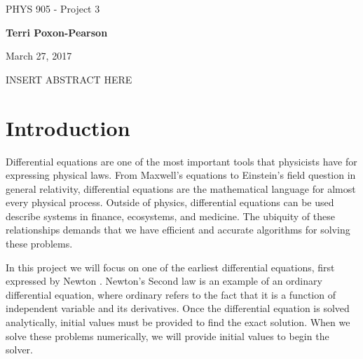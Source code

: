 \documentclass[%
oneside,                 %
final,                   %
10pt]{article}
\begin{document}

\newcommand{\exercisesection}[1]{\subsection*{#1}}






\thispagestyle{empty}

\begin{center}
{\LARGE\bf
\begin{spacing}{1.25}
PHYS 905 - Project 3
\end{spacing}
}
\end{center}


\begin{center}
{\bf Terri Poxon-Pearson}
\end{center}

    

\begin{center}
March 27, 2017
\end{center}

\vspace{1cm}

INSERT ABSTRACT HERE

\tableofcontents
 
\section{Introduction}

Differential equations are one of the most important tools that physicists have for expressing physical laws.  From Maxwell's equations to Einstein's field question in general relativity, differential equations are the mathematical language for almost every physical process.  Outside of physics, differential equations can be used describe systems in finance, ecosystems, and medicine.  The ubiquity of these relationships demands that we have efficient and accurate algorithms for solving these problems.

In this project we will focus on one of the earliest differential equations, first expressed by Newton \cite{LectureNotes}.  Newton's Second law is an example of an ordinary differential equation, where ordinary refers to the fact that it is a function of independent variable and its derivatives.  Once the differential equation is solved analytically, initial values must be provided to find the exact solution.  When we solve these problems numerically, we will provide initial values to begin the solver. 
\end{document}
